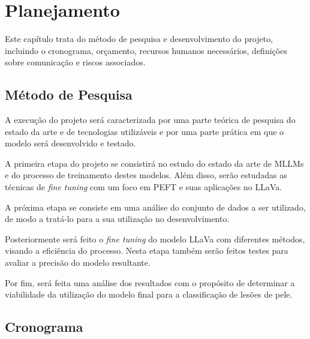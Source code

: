 \chapter{Planejamento}

Este capítulo trata do método de pesquisa e desenvolvimento do projeto, incluindo o cronograma, orçamento, recursos humanos necessários, definições sobre comunicação e
riscos associados.

\section{Método de Pesquisa}

A execução do projeto será caracterizada por uma parte teórica de pesquisa do estado da arte e de tecnologias utilizáveis e por uma parte prática em que o modelo será
desenvolvido e testado.

A primeira etapa do projeto se consistirá no estudo do estado da arte de \ac{MLLMs} e do processo de treinamento destes modelos. Além disso, serão estudadas as técnicas
de \textit{fine tuning} com um foco em \ac{PEFT} e suas aplicações no \ac{LLaVa}.

A próxima etapa se consiste em uma análise do conjunto de dados a ser utilizado, de modo a tratá-lo para a sua utilização no desenvolvimento.

Posteriormente será feito o \textit{fine tuning} do modelo \ac{LLaVa} com diferentes métodos, visando a eficiência do processo. Nesta etapa também serão feitos testes
para avaliar a precisão do modelo resultante.

Por fim, será feita uma análise dos resultados com o propósito de determinar a viabilidade da utilização do modelo final para a classificação de lesões de pele.

\pagebreak

\section{Cronograma}

\vspace{-1cm}

